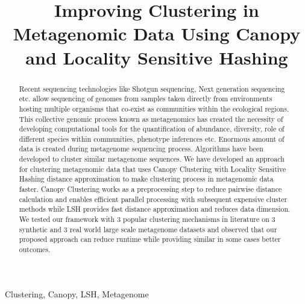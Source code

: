 \documentclass[10pt, conference, compsocconf]{IEEEtran}
\begin{document}
\title{Improving Clustering in Metagenomic Data Using Canopy and Locality Sensitive Hashing}

\author{
}
\maketitle

\begin{abstract}

Recent sequencing technologies like Shotgun sequencing, Next generation sequencing etc. allow sequencing of genomes from samples taken directly from environments hosting multiple organisms that co-exist as communities within the ecological regions. This collective genomic process known as metagenomics has created the necessity of developing computational tools for the quantification of abundance, diversity, role of different species within communities, phenotype inferences etc. Enormous amount of data is created during metagenome sequencing process. Algorithms have been developed to cluster similar metagenome sequences. We have developed an approach for clustering metagenomic data that uses Canopy Clustering with Locality Sensitive Hashing distance approximation to make clustering process in metagenomic data faster. Canopy Clustering works as a preprocessing step to reduce pairwise distance calculation and enables efficient parallel processing with subsequent expensive cluster methods while LSH provides fast distance approximation and reduces data dimension. We tested our framework with 3 popular clustering mechanisms in literature on 3 synthetic and 3 real world large scale metagenome datasets and observed that our proposed approach can reduce runtime while providing similar in some cases better outcomes.

\end{abstract}

\begin{IEEEkeywords}
Clustering, Canopy, LSH, Metagenome
\end{IEEEkeywords}

%
\IEEEpeerreviewmaketitle
\end{document}
